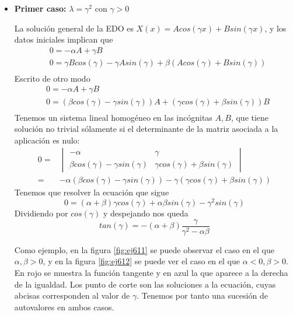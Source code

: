 \begin{itemize}
\item \textbf{Primer caso:} $\lambda=\gamma^2$ con $\gamma > 0$

La solución general de la EDO es $X(x) = Acos(\gamma x)+Bsin(\gamma x)$, y los datos iniciales implican que
\begin{align*}
& 0 = -\alpha A+\gamma B\\
& 0 = \gamma B cos(\gamma) - \gamma Asin(\gamma)+\beta (Acos(\gamma)+Bsin(\gamma))\\
\end{align*}
Escrito de otro modo
\begin{align*}
& 0 = -\alpha A+\gamma B\\
& 0 = \left(\beta cos(\gamma)-\gamma sin(\gamma)\right)A+\left(\gamma cos(\gamma)+\beta sin(\gamma)\right)B\\
\end{align*}
Tenemos un sistema lineal homogéneo en las incógnitas $A,B$, que tiene solución no trivial sólamente si el determinante de la matriz asociada a la aplicación es nulo:
\begin{align*}
0=&\begin{vmatrix}-\alpha & \gamma \\ \beta cos(\gamma)-\gamma sin(\gamma) & \gamma cos(\gamma) +\beta sin(\gamma)\end{vmatrix}\\
 = & -\alpha(\beta cos(\gamma)-\gamma sin(\gamma) )-\gamma(\gamma cos(\gamma) +\beta sin(\gamma))
\end{align*}
Tenemos que resolver la ecuación que sigue
$$0=(\alpha+\beta)\gamma cos(\gamma) +\alpha\beta sin(\gamma)-\gamma^2sin(\gamma)$$
Dividiendo por $cos(\gamma)$ y despejando nos queda
$$tan(\gamma) = -(\alpha+\beta)\frac{\gamma}{\gamma^2-\alpha\beta}$$

Como ejemplo, en la figura \ref{fig:ej611} se puede observar el caso en el que $\alpha, \beta > 0$, y en la figura \ref{fig:ej612} se puede ver el caso en el que $\alpha < 0, \beta > 0$. En rojo se muestra la función tangente y en azul la que aparece a la derecha de la igualdad. Los punto de corte son las soluciones a la ecuación, cuyas abcisas corresponden al valor de $\gamma$. Tenemos por tanto una sucesión de autovalores en ambos casos. 
\end{itemize}

